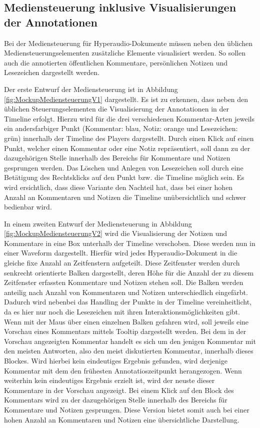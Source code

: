 \subsection{Mediensteuerung inklusive Visualisierungen der Annotationen}
\label{sub:Mediensteuerung}
Bei der Mediensteuerung für Hyperaudio-Dokumente müssen neben den üblichen Mediensteuerungselementen zusätzliche Elemente visualisiert werden. So sollen auch die annotierten öffentlichen Kommentare, persönlichen Notizen und Lesezeichen dargestellt werden.

Der erste Entwurf der Mediensteuerung ist in Abbildung \ref{fig:MockupMediensteuerungV1} dargestellt. Es ist zu erkennen, dass neben den üblichen Steuerungselementen die Visualisierung der Annotationen in der Timeline erfolgt. Hierzu wird für die drei verschiedenen Kommentar-Arten jeweils ein andersfarbiger Punkt (Kommentar: blau, Notiz: orange und Lesezeichen: grün) innerhalb der Timeline des Players dargestellt. Durch einen Klick auf einen Punkt, welcher einen Kommentar oder eine Notiz repräsentiert, soll dann zu der dazugehörigen Stelle innerhalb des Bereichs für Kommentare und Notizen gesprungen werden. Das Löschen und Anlegen von Lesezeichen soll durch eine Betätigung des Rechtsklicks auf den Punkt bzw. die Timeline möglich sein. Es wird ersichtlich, dass diese Variante den Nachteil hat, dass bei einer hohen Anzahl an Kommentaren und Notizen die Timeline unübersichtlich und schwer bedienbar wird.

In einem zweiten Entwurf der Mediensteuerung in Abbildung \ref{fig:MockupMediensteuerungV2} wird die Visualisierung der Notizen und Kommentare in eine Box unterhalb der Timeline verschoben. Diese werden nun in einer Waveform dargestellt. Hierfür wird jedes Hyperaudio-Dokument in die gleiche fixe Anzahl an Zeitfenstern aufgeteilt. Diese Zeitfenster werden durch senkrecht orientierte Balken dargestellt, deren Höhe für die Anzahl der zu diesem Zeitfenster erfassten Kommentare und Notizen stehen soll. Die Balken werden anteilig nach Anzahl von Kommentaren und Notizen unterschiedlich eingefärbt. Dadurch wird nebenbei das Handling der Punkte in der Timeline vereinheitlicht, da es hier nur noch die Lesezeichen mit ihren Interaktionsmöglichkeiten gibt. Wenn mit der Maus über einen einzelnen Balken gefahren wird, soll jeweils eine Vorschau eines Kommentars mittels Tooltip dargestellt werden. Bei dem in der Vorschau angezeigten Kommentar handelt es sich um den jenigen Kommentar mit den meisten Antworten, also den meist diskutierten Kommentar, innerhalb dieses Blockes. Wird hierbei kein eindeutiges Ergebnis gefunden, wird derjenige Kommentar mit dem den frühesten Annotatioszeitpunkt herangezogen. Wenn weiterhin kein eindeutiges Ergebnis erzielt ist, wird der neuste dieser Kommentare in der Vorschau angezeigt. Bei einem Klick auf den Block des Kommentars wird zu der dazugehörigen Stelle innerhalb des Bereichs für Kommentare und Notizen gesprungen. Diese Version bietet somit auch bei einer hohen Anzahl an Kommentaren und Notizen eine übersichtliche Darstellung.

